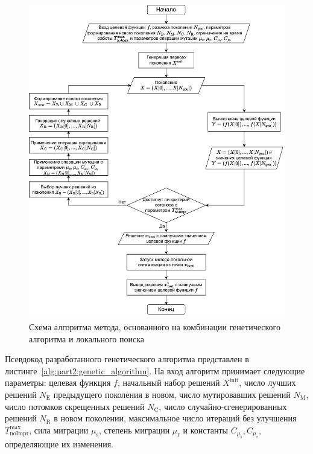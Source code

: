 \begin{figure}[ht]
  \centering
   \includegraphics[width=\linewidth]{images/part2/genetics_algorithm/genetic_algorithm_scheme.drawio.pdf}
   \caption{Схема алгоритма метода, основанного на комбинации генетического алгоритма и локального поиска}
  \label{fig:part2:genetic_algorithm}
\end{figure}



Псевдокод разработанного генетического алгоритма представлен в листинге~\ref{alg:part2:genetic_algorithm}.
На вход алгоритм принимает следующие параметры: целевая функция $f$, начальный набор решений $X^{\text{init}}$, число лучших решений $N_{\text{E}}$ предыдущего поколения в новом, число мутировавших решений $N_{\text{M}}$, число потомков скрещенных решений $N_\text{C}$, число случайно-сгенерированных решений $N_\text{R}$ в новом поколении, максимальное число итераций без улучшения $T_{\text{noImpr}}^{\max}$, сила миграции $\mu_\text{s}$, степень миграции $\mu_\text{r}$ и константы $C_{\mu_\text{s}}, C_{\mu_\text{r}}$, определяющие их изменения.

